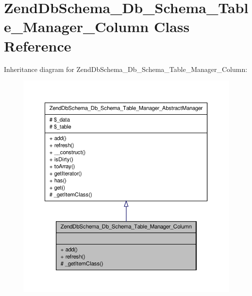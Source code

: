\hypertarget{classZendDbSchema__Db__Schema__Table__Manager__Column}{\section{\-Zend\-Db\-Schema\-\_\-\-Db\-\_\-\-Schema\-\_\-\-Table\-\_\-\-Manager\-\_\-\-Column \-Class \-Reference}
\label{classZendDbSchema__Db__Schema__Table__Manager__Column}
}


\-Inheritance diagram for \-Zend\-Db\-Schema\-\_\-\-Db\-\_\-\-Schema\-\_\-\-Table\-\_\-\-Manager\-\_\-\-Column\-:\nopagebreak
\begin{figure}[H]
\begin{center}
\leavevmode
\includegraphics[width=350pt]{classZendDbSchema__Db__Schema__Table__Manager__Column__inherit__graph}
\end{center}
\end{figure}


